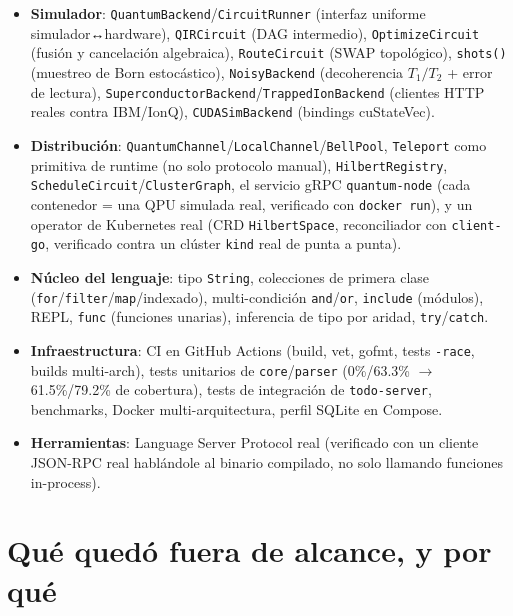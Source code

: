 \documentclass[12pt, a4paper, openany]{report}
\theoremstyle{definition}
\begin{document}
\begin{itemize}
  \item \textbf{Simulador}: \texttt{QuantumBackend}/\texttt{CircuitRunner} (interfaz uniforme simulador↔hardware), \texttt{QIRCircuit} (DAG intermedio), \texttt{OptimizeCircuit} (fusión y cancelación algebraica), \texttt{RouteCircuit} (SWAP topológico), \texttt{shots()} (muestreo de Born estocástico), \texttt{NoisyBackend} (decoherencia $T_1/T_2$ + error de lectura), \texttt{SuperconductorBackend}/\texttt{TrappedIonBackend} (clientes HTTP reales contra IBM/IonQ), \texttt{CUDASimBackend} (bindings cuStateVec).
  \item \textbf{Distribución}: \texttt{QuantumChannel}/\texttt{LocalChannel}/\texttt{BellPool}, \texttt{Teleport} como primitiva de runtime (no solo protocolo manual), \texttt{HilbertRegistry}, \texttt{ScheduleCircuit}/\texttt{ClusterGraph}, el servicio gRPC \texttt{quantum-node} (cada contenedor = una QPU simulada real, verificado con \texttt{docker run}), y un operator de Kubernetes real (CRD \texttt{HilbertSpace}, reconciliador con \texttt{client-go}, verificado contra un clúster \texttt{kind} real de punta a punta).
  \item \textbf{Núcleo del lenguaje}: tipo \texttt{String}, colecciones de primera clase (\texttt{for}/\texttt{filter}/\texttt{map}/indexado), multi-condición \texttt{and}/\texttt{or}, \texttt{include} (módulos), REPL, \texttt{func} (funciones unarias), inferencia de tipo por aridad, \texttt{try}/\texttt{catch}.
  \item \textbf{Infraestructura}: CI en GitHub Actions (build, vet, gofmt, tests \texttt{-race}, builds multi-arch), tests unitarios de \texttt{core}/\texttt{parser} (0\%/63.3\% $\to$ 61.5\%/79.2\% de cobertura), tests de integración de \texttt{todo-server}, benchmarks, Docker multi-arquitectura, perfil SQLite en Compose.
  \item \textbf{Herramientas}: Language Server Protocol real (verificado con un cliente JSON-RPC real hablándole al binario compilado, no solo llamando funciones in-process).
\end{itemize}

\section{Qué quedó fuera de alcance, y por qué}
\label{sec:futuro-quera}
\end{document}
